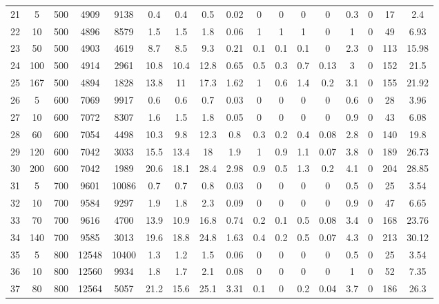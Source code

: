 \documentclass[11pt]{article}
\begin{document}
\begin{appendices}
\begin{landscape}
\begin{longtable}[c]{ccccc|cccc|cccc|cccc}
				\rowcolor[HTML]{EFEFEF} 
				21 & 5 & 500 & 4909 & 9138 & 0.4 & 0.4 & 0.5 & 0.02 & 0 & 0 & 0 & 0 & 0.3 & 0 & 17 & 2.4 \\
				\rowcolor[HTML]{EFEFEF} 
				22 & 10 & 500 & 4896 & 8579 & 1.5 & 1.5 & 1.8 & 0.06 & 1 & 1 & 1 & 0 & 1 & 0 & 49 & 6.93 \\
				\rowcolor[HTML]{EFEFEF} 
				23 & 50 & 500 & 4903 & 4619 & 8.7 & 8.5 & 9.3 & 0.21 & 0.1 & 0.1 & 0.1 & 0 & 2.3 & 0 & 113 & 15.98 \\
				\rowcolor[HTML]{EFEFEF} 
				24 & 100 & 500 & 4914 & 2961 & 10.8 & 10.4 & 12.8 & 0.65 & 0.5 & 0.3 & 0.7 & 0.13 & 3 & 0 & 152 & 21.5 \\
				\rowcolor[HTML]{EFEFEF} 
				25 & 167 & 500 & 4894 & 1828 & 13.8 & 11 & 17.3 & 1.62 & 1 & 0.6 & 1.4 & 0.2 & 3.1 & 0 & 155 & 21.92 \\
				26 & 5 & 600 & 7069 & 9917 & 0.6 & 0.6 & 0.7 & 0.03 & 0 & 0 & 0 & 0 & 0.6 & 0 & 28 & 3.96 \\
				27 & 10 & 600 & 7072 & 8307 & 1.6 & 1.5 & 1.8 & 0.05 & 0 & 0 & 0 & 0 & 0.9 & 0 & 43 & 6.08 \\
				28 & 60 & 600 & 7054 & 4498 & 10.3 & 9.8 & 12.3 & 0.8 & 0.3 & 0.2 & 0.4 & 0.08 & 2.8 & 0 & 140 & 19.8 \\
				29 & 120 & 600 & 7042 & 3033 & 15.5 & 13.4 & 18 & 1.9 & 1 & 0.9 & 1.1 & 0.07 & 3.8 & 0 & 189 & 26.73 \\
				30 & 200 & 600 & 7042 & 1989 & 20.6 & 18.1 & 28.4 & 2.98 & 0.9 & 0.5 & 1.3 & 0.2 & 4.1 & 0 & 204 & 28.85 \\
				\rowcolor[HTML]{EFEFEF} 
				31 & 5 & 700 & 9601 & 10086 & 0.7 & 0.7 & 0.8 & 0.03 & 0 & 0 & 0 & 0 & 0.5 & 0 & 25 & 3.54 \\
				\rowcolor[HTML]{EFEFEF} 
				32 & 10 & 700 & 9584 & 9297 & 1.9 & 1.8 & 2.3 & 0.09 & 0 & 0 & 0 & 0 & 0.9 & 0 & 47 & 6.65 \\
				\rowcolor[HTML]{EFEFEF} 
				33 & 70 & 700 & 9616 & 4700 & 13.9 & 10.9 & 16.8 & 0.74 & 0.2 & 0.1 & 0.5 & 0.08 & 3.4 & 0 & 168 & 23.76 \\
				\rowcolor[HTML]{EFEFEF} 
				34 & 140 & 700 & 9585 & 3013 & 19.6 & 18.8 & 24.8 & 1.63 & 0.4 & 0.2 & 0.5 & 0.07 & 4.3 & 0 & 213 & 30.12 \\
				\rowcolor[HTML]{EFEFEF} 
				35 & 5 & 800 & 12548 & 10400 & 1.3 & 1.2 & 1.5 & 0.06 & 0 & 0 & 0 & 0 & 0.5 & 0 & 25 & 3.54 \\
				36 & 10 & 800 & 12560 & 9934 & 1.8 & 1.7 & 2.1 & 0.08 & 0 & 0 & 0 & 0 & 1 & 0 & 52 & 7.35 \\
				37 & 80 & 800 & 12564 & 5057 & 21.2 & 15.6 & 25.1 & 3.31 & 0.1 & 0 & 0.2 & 0.04 & 3.7 & 0 & 186 & 26.3 \\

\end{longtable}
\end{landscape}
\end{appendices}
\end{document}
